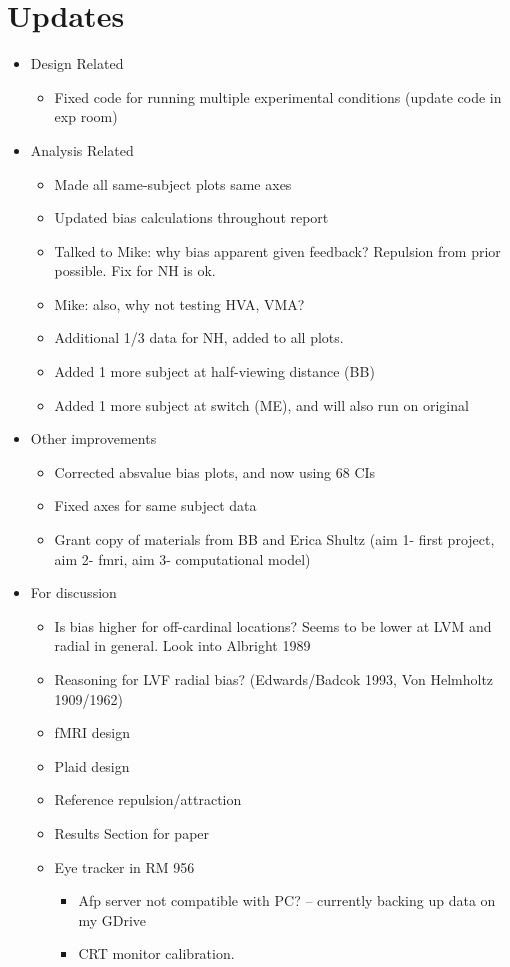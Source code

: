 \documentclass[11pt]{article} %
\begin{document}
\section{Updates} 
\begin{itemize}
\item Design Related
	\begin{itemize}
	\item Fixed code for running multiple experimental conditions (update code in exp room)
	\end{itemize}
\item Analysis Related
	\begin{itemize}
	\item Made all same-subject plots same axes
	\item Updated bias calculations throughout report
	\item Talked to Mike: why bias apparent given feedback? Repulsion from prior possible. Fix for NH is ok.
	\item Mike: also, why not testing HVA, VMA?
	\item Additional 1/3 data for NH, added to all plots.
	\item Added 1 more subject at half-viewing distance (BB)
	\item Added 1 more subject at switch (ME), and will also run on original
	\end{itemize}
\item Other improvements
	\begin{itemize}
	\item Corrected absvalue bias plots, and now using 68 CIs
	\item Fixed axes for same subject data
	\item Grant copy of materials from BB and Erica Shultz (aim 1- first project, aim 2- fmri, aim 3- computational model)
	\end{itemize}
\item For discussion
	\begin{itemize}
	\item Is bias higher for off-cardinal locations? Seems to be lower at LVM and radial in general. Look into Albright 1989
	\item Reasoning for LVF radial bias? (Edwards/Badcok 1993, Von Helmholtz 1909/1962)
	\item fMRI design
	\item Plaid design
	\item Reference repulsion/attraction
	\item Results Section for paper
	\item Eye tracker in RM 956
		\begin{itemize}
			\item{Afp server not compatible with PC? -- currently backing up data on my GDrive}
			\item{CRT monitor calibration.}
		\end{itemize}
	\end{itemize}
\end{itemize}
\end{document}
